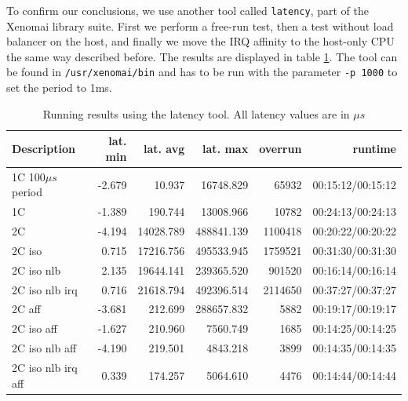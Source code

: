 \documentclass[]{scrartcl}
\begin{document}

To confirm our conclusions, we use another tool called \texttt{latency}, part of the Xenomai library suite. First we perform a free-run test, then a test without load balancer on the host, and finally we move the IRQ affinity to the host-only CPU the same way described before. The results are displayed in table \ref{tab:latency}. The tool can be found in \texttt{/usr/xenomai/bin} and has to be run with the parameter \texttt{-p 1000} to set the period to 1ms.

\begin{table}[h]
	\caption{Running results using the  latency tool. All latency values are in $\mu s$}
	\begin{tabular}{l|r|r| r|r | r }
		Description &lat. min&lat. avg& lat. max&overrun& runtime\\
		\hline
		1C 100$\mu s$ period&     -2.679&     10.937&  16748.829&   65932&    00:15:12/00:15:12\\
		1C&     -1.389&    190.744&  13008.966&   10782&    00:24:13/00:24:13\\
		2C&     -4.194&  14028.789& 488841.139& 1100418&    00:20:22/00:20:22\\
		2C iso&      0.715&  17216.756& 495533.945& 1759521&    00:31:30/00:31:30\\
		2C iso nlb&      2.135&  19644.141& 239365.520&  901520&   00:16:14/00:16:14\\
		2C iso nlb irq&      0.716&  21618.794& 492396.514& 2114650&  00:37:27/00:37:27\\
		2C aff&     -3.681&    212.699& 288657.832&    5882&   00:19:17/00:19:17\\
		2C iso aff &     -1.627&    210.960&   7560.749&    1685&  00:14:25/00:14:25\\
		2C iso nlb aff &     -4.190&    219.501&   4843.218&    3899&    00:14:35/00:14:35\\
		2C iso nlb irq aff&      0.339&    174.257&   5064.610&    4476&   00:14:44/00:14:44\\

	\end{tabular}
	\label{tab:latency}
\end{table}
\end{document}
